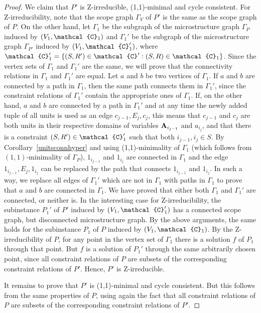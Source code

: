 \documentclass[11pt]{amsart}
\newcommand{\m}[1]{{\uppercase {\mathbf {#1}}}}
\newcommand{\vr}[1]{{\uppercase {\mathcal{#1}}}}
\theoremstyle{definition}
\begin{document}
\begin{proof}
We claim that $P'$ is Z-irreducible, (1,1)-minimal and cycle consistent. For Z-irreducibility, note that the scope graph $\Gamma_V$ of $P'$ is the same as the scope graph of $P$. On the other hand, let $\Gamma_1$ be the subgraph of the microstructure graph $\Gamma_P$ induced by $(V_1,\vr c_1)$ and $\Gamma_1'$ be the subgraph of the microstructure graph $\Gamma_{P'}$ induced by $(V_1,\vr c_1')$, where $\vr c_1'=\{(S,R')\in\vr c':(S,R)\in \vr c_1\}$. Since the vertex sets of $\Gamma_1$ and $\Gamma_1'$ are the same, we will prove that the connectivity relations in $\Gamma_1$ and $\Gamma_1'$ are equal. Let $a$ and $b$ be two vertices of $\Gamma_1$. If $a$ and $b$ are connected by a path in $\Gamma_1$, then the same path connects them in $\Gamma_1'$, since the constraint relations of $\Gamma_1'$ contain the appropriate ones of $\Gamma_1$. If, on the other hand, $a$ and $b$ are connected by a path in $\Gamma_1'$ and at any time the newly added tuple of all units is used as an edge $c_{j-1}, E_j, c_j$, this means that $c_{j-1}$ and $c_j$ are both units in their respective domains of variables $\m a_{i_{j-1}}$ and $a_{i_j}$, and that there is a constraint $(S,R')\in\vr c_1'$ such that both $i_{j-1},i_j\in S$. By Corollary~\ref{unitsconnhyper} and using (1,1)-minimality of $\Gamma_1$ (which follows from $(1,1)$-minimality of $\Gamma_P$), $1_{i_{j-1}}$ and $1_{i_j}$ are connected in $\Gamma_1$ and the edge $1_{i_{j-1}}, E_j, 1_{i_j}$ can be replaced by the path that connects $1_{i_{j-1}}$ and $1_{i_j}$. In such a way, we replace all edges of $\Gamma_1'$ which are not in $\Gamma_1$ with paths in $\Gamma_1$ to prove that $a$ and $b$ are connected in $\Gamma_1$. We have proved that either both $\Gamma_1$ and $\Gamma_1'$ are connected, or neither is. In the interesting case for Z-irreducibility, the subinstance $P_1'$ of $P'$ induced by $(V_1,\vr c_1')$ has a connected scope graph, but disconnected microstructure graph. By the above arguments, the same holds for the subinstance $P_1$ of $P$ induced by $(V_1,\vr c_1)$. By the Z-irreducibility of $P$, for any point in the vertex set of $\Gamma_1$ there is a solution $f$ of $P_1$ through that point. But $f$ is a solution of $P_1'$ through the same arbitrarily chosen point, since all constraint relations of $P$ are subsets of the corresponding constraint relations of $P'$. Hence, $P'$ is Z-irreducible.

It remains to prove that $P'$ is (1,1)-minimal and cycle consistent. But this follows from the same properties of $P$, using again the fact that all constraint relations of $P$ are subsets of the corresponding constraint relations of $P'$.


\end{proof}
\end{document}

